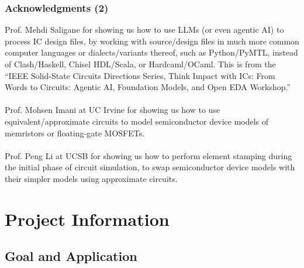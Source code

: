 \documentclass[xcolor={usenames,dvipsnames},hyperref={hyperindex,bookmarks}]{beamer}
\begin{document}


\begin{frame}
	\frametitle{Acknowledgments (2)}
	Prof. Mehdi Saligane for showing us how to use LLMs (or even agentic AI) to process IC design files, by working with source/design files in much more common computer languages or dialects/variants thereof, such as Python/PyMTL, instead of Clash/Haskell, Chisel HDL/Scala, or Hardcaml/OCaml. This is from the ``IEEE Solid-State Circuits Directions Series, Think Impact with ICs: From Words to Circuits: Agentic AI, Foundation Models, and Open EDA Workshop.'' \\
	\ \\
	Prof. Mohsen Imani at UC Irvine for showing us how to use equivalent/approximate circuits to model semiconductor device models of memristors or floating-gate MOSFETs. \\
	\ \\
	Prof. Peng Li at UCSB for showing us how to perform element stamping during the initial phase of circuit simulation, to swap semiconductor device models with their simpler models using approximate circuits.
\end{frame}





\section{Project Information}




\subsection{Goal and Application}

\end{document}
